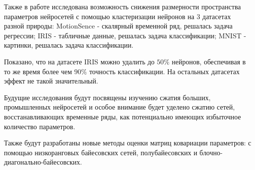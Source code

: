 \documentclass[12pt, twoside]{article}
\begin{document}
Также в работе исследована возможность снижения размерности пространства параметров нейросетей с помощью кластеризации нейронов на 3 датасетах разной природы: MotionSence - скалярный временной ряд, решалась задача регрессии; IRIS - табличные данные, решалась задача классификации; MNIST - картинки, решалась задача классификации. 

Показано, что на датасете IRIS можно удалить до $50\%$ нейронов, обеспечивая в то же время более чем $90\%$ точность классификации. На остальных датасетах эффект не такой значительный.


Будущие исследования будут посвящены изучению сжатия больших, промышленных нейросетей и особое внимание будет уделено сжатию сетей, восстанавливающих временные ряды, как потенциально имеющих избыточное количество параметров.

Также будут разработаны новые методы оценки матриц ковариации параметров: с помощью низкоранговых байесовских сетей, полубайесовских и блочно-диагонально-байесовских.
\end{document}
